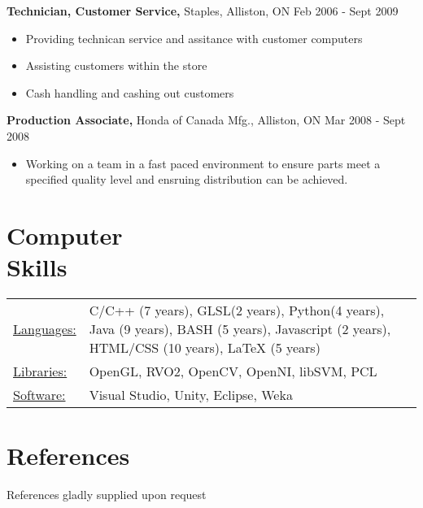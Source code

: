 \documentclass[margin]{res}
\begin{document}
\begin{resume}
	{\bf Technician, Customer Service,} Staples, Alliston, ON \hfill Feb 2006 - Sept 2009
	\begin{itemize} \itemsep -2pt
	\item Providing technican service and assitance with customer computers
	\item Assisting customers within the store
	\item Cash handling and cashing out customers
	\end{itemize}

	{\bf Production Associate,} Honda of Canada Mfg., Alliston, ON \hfill Mar 2008 - Sept 2008
	\begin{itemize} \itemsep -2pt
	\item Working on a team in a fast paced environment to ensure parts meet a specified quality level and ensruing distribution can be achieved.
	\end{itemize}
 

\section{Computer \\ Skills}
   \begin{tabular}{l p{3in}}
    \underline{Languages:} & C/C++ (7 years), GLSL(2 years), Python(4 years), Java (9 years), BASH (5 years),  Javascript (2 years), HTML/CSS (10 years), LaTeX (5 years)\\
    \underline{Libraries:} & OpenGL, RVO2, OpenCV, OpenNI, libSVM, PCL\\
    \underline{Software:} & Visual Studio, Unity, Eclipse, Weka \\
 \end{tabular}

\section{References}
	References gladly supplied upon request

\end{resume} 
\end{document}
